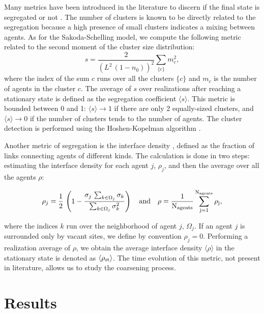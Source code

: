 Many metrics have been introduced in the literature to discern if the final state is segregated or not \cite{Gauvin_2009,lenormand-2015,randomwalks,urban}. The number of clusters is known to be directly related to the segregation because a high presence of small clusters indicates a mixing between agents. As for the Sakoda-Schelling model\cite{Gauvin_2009}, we compute the following metric related to the second moment of the cluster size distribution:
\begin{equation}
s = \frac{2}{\left(L^{2} \, (1-n_0)\right)^{2}} \sum_{\{c\}} m_{c}^{2} ,
\end{equation}
where the index of the sum $c$ runs over all the clusters $\{c\}$ and $m_c$ is the number of agents in the cluster $c$. The average of $s$ over realizations after reaching a stationary state is defined as the segregation coefficient $\langle s \rangle$. This metric is bounded between 0 and 1: $\langle s \rangle \to 1$ if there are only 2 equally-sized clusters, and $\langle s \rangle \to 0$ if the number of clusters tends to the number of agents. The cluster detection is performed using the Hoshen-Kopelman algorithm \cite{HoKo}.

Another metric of segregation is the interface density \cite{Dall_Asta_2008}, defined as the fraction of links connecting agents of different kinds. The calculation is done in two steps: estimating the interface density for each agent $j$, $\rho_j$, and then the average over all the agents $\rho$:

\begin{equation}
    \rho_j = \frac{1}{2} \, \left( 1 - \frac{\sigma_j \,  \sum_{k \in \Omega_j} \sigma_k}{\sum_{k \in \Omega_j} \sigma_k^2 } \right) \quad \rm{and} \quad \rho = \frac{1}{N_{\rm agents}} \sum_{j = 1}^{N_{\rm agents}} \rho_j ,
\end{equation}

where the indices $k$ run over the neighborhood of agent $j$, $\Omega_j$. If an agent $j$ is surrounded only by vacant sites, we define by convention $\rho_j = 0$. Performing a realization average of $\rho$, we obtain the average interface density $\langle \rho \rangle$ in the stationary state is denoted as $\langle\rho_{\rm{st}} \rangle$. The time evolution of this metric, not present in literature, allows us to study the coarsening process.

\section{Results} 

